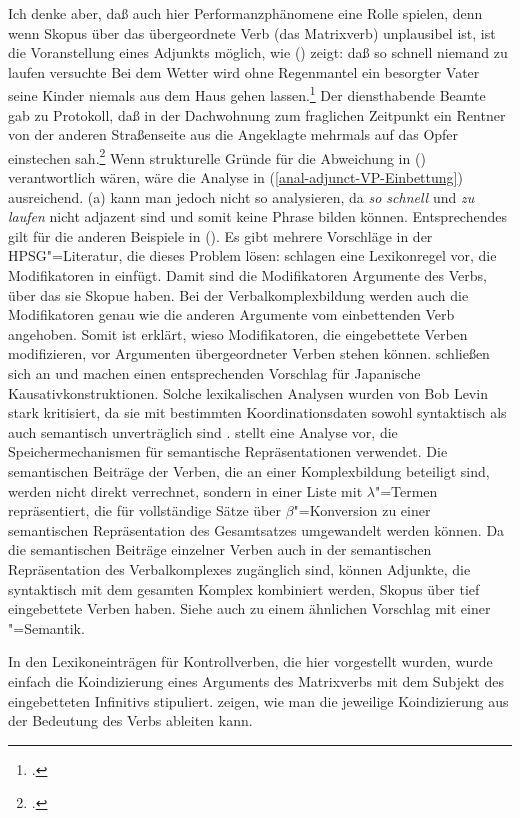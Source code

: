 {{Ich denke aber, daß auch hier Performanzphänomene eine Rolle spielen, denn wenn Skopus
über das übergeordnete Verb (das Matrixverb) unplausibel ist, ist die Voranstellung eines Adjunkts möglich, wie
() zeigt:
\eal
\ex daß so schnell niemand zu laufen versuchte
\ex Bei dem Wetter wird ohne Regenmantel ein besorgter Vater seine Kinder niemals aus dem Haus gehen lassen.\footnote{
.
}
\ex Der diensthabende Beamte gab zu Protokoll, daß in der Dachwohnung zum fraglichen Zeitpunkt ein Rentner von der
    anderen Straßenseite aus die Angeklagte mehrmals auf das Opfer einstechen sah.\footnote{
.
}
\zl
Wenn strukturelle Gründe für die Abweichung in () verantwortlich wären, wäre die Analyse in
(\ref{anal-adjunct-VP-Einbettung}) ausreichend. (a) kann man jedoch nicht so analysieren, da
\emph{so schnell} und \emph{zu laufen} nicht adjazent sind und somit keine Phrase bilden
können. Entsprechendes gilt für die anderen Beispiele in (). Es
gibt mehrere Vorschläge in der HPSG"=Literatur, die dieses Problem lösen: \citet{NB94} schlagen eine
Lexikonregel vor, die Modifikatoren in \compsln einfügt. Damit sind die Modifikatoren Argumente des
Verbs, über das sie Skopue haben. Bei der Verbalkomplexbildung werden auch die Modifikatoren genau wie die
anderen Argumente vom einbettenden Verb angehoben. Somit ist erklärt, wieso Modifikatoren, die
eingebettete Verben modifizieren, vor Argumenten übergeordneter Verben stehen können. \citet*{MSI99a}
schließen sich \citet{NB94} an und machen einen entsprechenden Vorschlag für
Japanische Kausativkonstruktionen. Solche lexikalischen
Analysen wurden von Bob Levin stark kritisiert, da sie mit bestimmten Koordinationsdaten sowohl
syntaktisch als auch semantisch unverträglich sind
\citep{Levine2003a,LH2006a}. \citet[Abschnitt~6]{Cipollone2001a} stellt eine Analyse vor, die
Speichermechanismen für semantische Repräsentationen verwendet. Die semantischen Beiträge der
Verben, die an einer Komplexbildung beteiligt sind, werden nicht direkt verrechnet, sondern in einer
Liste mit $\lambda$"=Termen repräsentiert, die für vollständige Sätze über $\beta$"=Konversion zu
einer semantischen Repräsentation des Gesamtsatzes umgewandelt werden können. Da die semantischen
Beiträge einzelner Verben auch in der semantischen Repräsentation des Verbalkomplexes zugänglich
sind, können Adjunkte, die syntaktisch mit dem gesamten Komplex kombiniert werden, Skopus über tief
eingebettete Verben haben. Siehe auch \citet{Crysmann2004a} zu einem ähnlichen Vorschlag mit einer \mrs"=Semantik.

In den Lexikoneinträgen für Kontrollverben, die hier vorgestellt wurden, wurde einfach die
Koindizierung eines Arguments des Matrixverbs mit dem Subjekt des eingebetteten Infinitivs
stipuliert. \citet[Kapitel~7]{ps2} zeigen, wie man die jeweilige Koindizierung aus der Bedeutung
des Verbs ableiten kann.
%
}%
}

